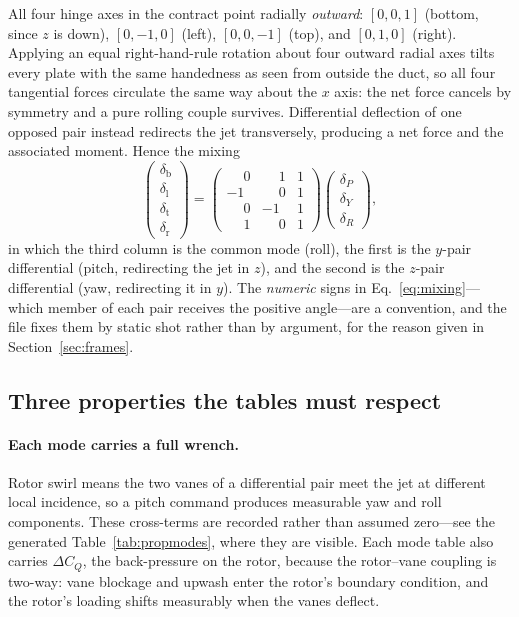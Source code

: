 \documentclass[11pt,a4paper]{article}
\begin{document}
All four hinge axes in the contract point radially \emph{outward}:
$[0,0,1]$ (bottom, since $z$ is down), $[0,-1,0]$ (left), $[0,0,-1]$
(top), and $[0,1,0]$ (right). Applying an equal right-hand-rule rotation
about four outward radial axes tilts every plate with the same handedness
as seen from outside the duct, so all four tangential forces circulate
the same way about the $x$ axis: the net force cancels by symmetry and a
pure rolling couple survives. Differential deflection of one opposed pair
instead redirects the jet transversely, producing a net force and the
associated moment. Hence the mixing
\begin{equation}
\begin{pmatrix}
\delta_{\mathrm{b}} \\ \delta_{\mathrm{l}} \\
\delta_{\mathrm{t}} \\ \delta_{\mathrm{r}}
\end{pmatrix}
=
\begin{pmatrix}
\phantom{-}0 & \phantom{-}1 & 1 \\
-1 & \phantom{-}0 & 1 \\
\phantom{-}0 & -1 & 1 \\
\phantom{-}1 & \phantom{-}0 & 1
\end{pmatrix}
\begin{pmatrix}
\delta_P \\ \delta_Y \\ \delta_R
\end{pmatrix},
\label{eq:mixing}
\end{equation}
in which the third column is the common mode (roll), the first is the
$y$-pair differential (pitch, redirecting the jet in $z$), and the second
is the $z$-pair differential (yaw, redirecting it in $y$). The
\emph{numeric} signs in Eq.~\eqref{eq:mixing}---which member of each pair
receives the positive angle---are a convention, and the file fixes them by
static shot rather than by argument, for the reason given in
Section~\ref{sec:frames}.

\subsection{Three properties the tables must respect}

\paragraph{Each mode carries a full wrench.} Rotor swirl means the two
vanes of a differential pair meet the jet at different local incidence,
so a pitch command produces measurable yaw and roll components. These
cross-terms are recorded rather than assumed zero---see the generated
Table~\ref{tab:propmodes}, where they are visible. Each mode table also
carries $\Delta C_Q$, the back-pressure on the rotor, because the
rotor--vane coupling is two-way: vane blockage and upwash enter the
rotor's boundary condition, and the rotor's loading shifts measurably
when the vanes deflect.
\end{document}
